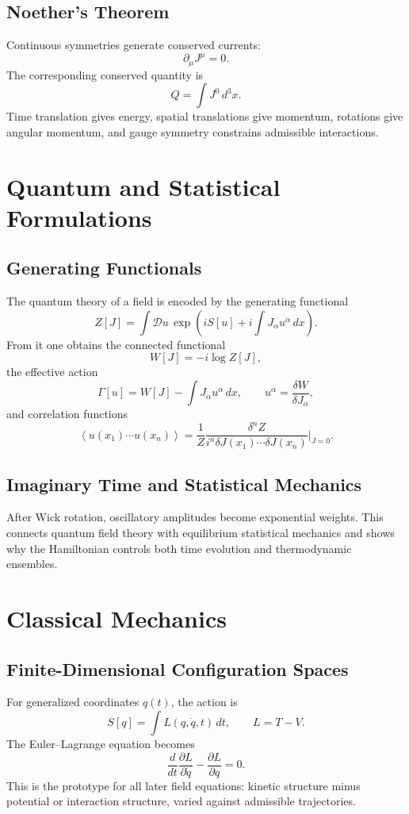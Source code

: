 \documentclass[11pt]{article}
\newcommand{\cD}{\mathcal{D}}
\begin{document}
\subsection{Noether's Theorem}
Continuous symmetries generate conserved currents:
\[
\partial_\mu J^\mu=0.
\]
The corresponding conserved quantity is
\[
Q=\int J^0\,d^3x.
\]
Time translation gives energy, spatial translations give momentum, rotations
give angular momentum, and gauge symmetry constrains admissible interactions.

\section{Quantum and Statistical Formulations}
\subsection{Generating Functionals}
The quantum theory of a field is encoded by the generating functional
\[
\boxed{
Z[J]=\int \cD u\,
\exp\left(
iS[u]+i\int J_\alpha u^\alpha\,dx
\right).
}
\]
From it one obtains the connected functional
\[
W[J]=-i\log Z[J],
\]
the effective action
\[
\Gamma[u]=W[J]-\int J_\alpha u^\alpha\,dx,
\qquad
u^\alpha=\frac{\delta W}{\delta J_\alpha},
\]
and correlation functions
\[
\boxed{
\left< u(x_1)\cdots u(x_n)\right>
=
\frac{1}{Z}
\frac{\delta^n Z}{i^n\delta J(x_1)\cdots\delta J(x_n)}
\Bigg|_{J=0}.
}
\]

\subsection{Imaginary Time and Statistical Mechanics}
After Wick rotation, oscillatory amplitudes become exponential weights. This
connects quantum field theory with equilibrium statistical mechanics and shows
why the Hamiltonian controls both time evolution and thermodynamic ensembles.

\section{Classical Mechanics}
\subsection{Finite-Dimensional Configuration Spaces}
For generalized coordinates $q(t)$, the action is
\[
S[q]=\int L(q,\dot q,t)\,dt,
\qquad
L=T-V.
\]
The Euler--Lagrange equation becomes
\[
\frac{d}{dt}\frac{\partial L}{\partial \dot q}
-\frac{\partial L}{\partial q}=0.
\]
This is the prototype for all later field equations: kinetic structure minus
potential or interaction structure, varied against admissible trajectories.
\end{document}
